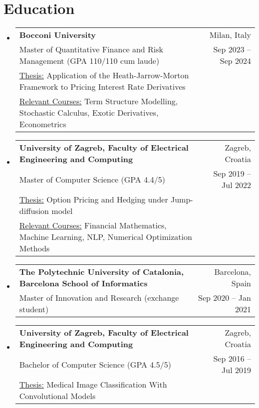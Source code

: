 \documentclass[letterpaper,10pt]{article}
\makeatletter
\newcommand{\resumeItem}[1]{
  \item\small{
    {#1 \vspace{-2pt}}
  }
}
\newcommand{\resumeSubheading}[4]{
  \vspace{-2pt}\item
    \begin{tabular*}{0.97\textwidth}[t]{l@{\extracolsep{\fill}}r}
      \textbf{#1} & #2 \\
      \small #3 & \small #4 \\
    \end{tabular*}\vspace{-7pt}
}
\newcommand{\resumeSubheadingWithAdditional}[6]{
  \vspace{-2pt}\item
    \begin{tabular*}{0.97\textwidth}[t]{l@{\extracolsep{\fill}}r}
      \textbf{#1} & #2 \\
      \small #3 & \small #4 \\
      \small #5 \\
      \small #6
    \end{tabular*}\vspace{-7pt}
}
\newcommand{\resumeSubheadingWithAdditionall}[5]{
  \vspace{-2pt}\item
    \begin{tabular*}{0.97\textwidth}[t]{l@{\extracolsep{\fill}}r}
      \textbf{#1} & #2 \\
      \small #3 & \small #4 \\
      \small #5
    \end{tabular*}\vspace{-7pt}
}
\newcommand{\resumeProjectHeading}[2]{
    \item
    \begin{tabular*}{0.97\textwidth}{l@{\extracolsep{\fill}}r}
      \small#1 & #2 \\
    \end{tabular*}\vspace{-7pt}
}
\newcommand{\resumeSubHeadingListStart}{\begin{itemize}[leftmargin=0.15in, label={}]}
\newcommand{\resumeSubHeadingListEnd}{\end{itemize}}
\newcommand{\resumeItemListStart}{\begin{itemize}}
\newcommand{\resumeItemListEnd}{\end{itemize}\vspace{-5pt}}
\makeatother
\begin{document}

\vspace{-10pt}
\section{Education}
  \resumeSubHeadingListStart
    \resumeSubheadingWithAdditional
      {Bocconi University}{Milan, Italy}
      {Master of Quantitative Finance and Risk Management (GPA 110/110 cum laude)}{Sep 2023 -- Sep 2024}{\underline{Thesis:} Application of the Heath-Jarrow-Morton Framework to Pricing Interest Rate Derivatives}{\underline{Relevant Courses:} Term Structure Modelling, Stochastic Calculus, Exotic Derivatives, Econometrics}
    \resumeSubheadingWithAdditional
      {University of Zagreb, Faculty of Electrical Engineering and Computing}{Zagreb, Croatia}
      {Master of Computer Science (GPA 4.4/5)}{Sep 2019 -- Jul 2022}{\underline{Thesis:} Option Pricing and Hedging under Jump-diffusion model}
      {\underline{Relevant Courses:} Financial Mathematics, Machine Learning, NLP, Numerical Optimization Methods}
    \resumeSubheading 
      {The Polytechnic University of Catalonia, Barcelona School of Informatics}{Barcelona, Spain}
      {Master of Innovation and Research (exchange student)}{Sep 2020 -- Jan 2021}
    \resumeSubheadingWithAdditionall
      {University of Zagreb, Faculty of Electrical Engineering and Computing}{Zagreb, Croatia}
      {Bachelor of Computer Science (GPA 4.5/5)}{Sep 2016 -- Jul 2019}{\underline{Thesis:} Medical Image Classification With Convolutional Models}
  \resumeSubHeadingListEnd
\end{document}
